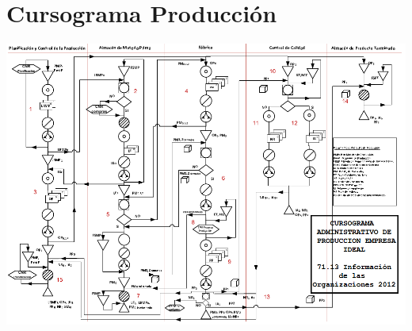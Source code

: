 \pagebreak
\section{Cursograma Producci\'on}
\begin{center}
 \includegraphics[angle=90,scale=0.85,keepaspectratio=true]{./Circuitos-Teoricos/Produccion/Images/cursograma-produccion.png}
\end{center}


